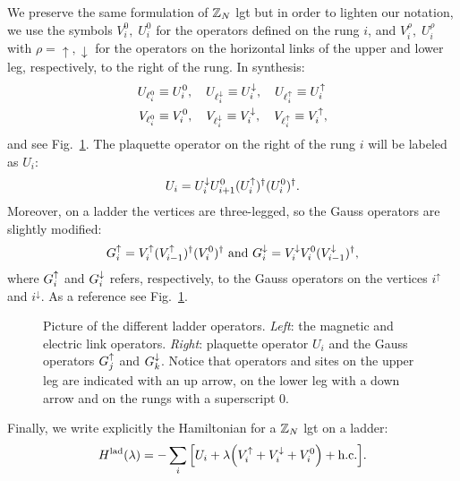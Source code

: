 We preserve the same formulation of $\mathbb{Z}_N$ \ac{lgt} but in order to lighten our notation,
we use the symbols $V^0_i, \; U^0_i$ for the operators defined on the rung $i$, and  $V^{\rho}_i, \; U^{\rho}_i$ with $\rho = \uparrow, \downarrow$ for the operators on the horizontal links of the upper and lower leg, respectively, to the right of the rung.
In synthesis:
\begin{equation}
    \begin{split}
        U_{\ell^0_i} & \equiv U^0_i, \quad
        U_{\ell^\downarrow_i}   \equiv U^{\downarrow}_i, \quad
        U_{\ell^\uparrow_i}   \equiv U^{\uparrow}_i \\
        V_{\ell^0_i} & \equiv V^0_i, \quad
        V_{\ell^\downarrow_i}   \equiv V^{\downarrow}_i, \quad
        V_{\ell^\uparrow_i}   \equiv V^{\uparrow}_i,
    \end{split}
\end{equation}
and see Fig.~\ref{fig:ladder_operators}.
The plaquette operator on the right of the rung $i$ will be labeled as $U_i$:
\begin{equation}
    U_i = U^{\downarrow}_i U^0_{i+1} (U^{\uparrow}_i)^{\dagger} (U^0_i)^{\dagger}.
    \label{eq:plaq_op_ladder}
\end{equation}
Moreover, on a ladder the vertices are three-legged, so the Gauss operators are slightly modified:
\begin{equation}
    G^{\uparrow}_i
    = V^{\uparrow}_i ( V^{\uparrow}_{i-1} )^\dagger ( V^0_i )^\dagger \text{~and~}
    G^{\downarrow}_i
    = V^{\downarrow}_i V^0_i ( V^{\downarrow}_{i-1} )^\dagger,
    \label{eq:gauss_law_ladder}
\end{equation}
where $G^{\uparrow}_i$ and $G^{\downarrow}_i$ refers, respectively, to the Gauss operators on the vertices $i^{\uparrow}$ and $i^{\downarrow}$.
As a reference see Fig.~\ref{fig:ladder_operators}.

\begin{figure}
    \centering
    
    \caption{%
        Picture of the different ladder operators.
        \emph{Left}: the magnetic and electric link operators.
        \emph{Right}: plaquette operator $U_i$ and the Gauss operators $G^{\uparrow}_j$ and $G^{\downarrow}_k$.
        Notice that operators and sites on the upper leg are indicated with an up arrow, on the lower leg with a down arrow and on the rungs with a superscript $0$.
    }
    \label{fig:ladder_operators}
\end{figure}


Finally, we write explicitly the Hamiltonian for a $\mathbb{Z}_N$ \ac{lgt} on a ladder:
\begin{equation}
    \Hladder(\lambda) =
    - \sum_{i} \bqty{ U_i + \lambda \pqty{ \Vup_i + \Vdown_i + V^0_i } + \text{h.c.} }.
    \label{eq:ladder_hamiltonian}
\end{equation}


